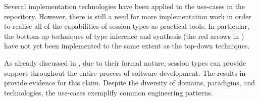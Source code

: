 
Several implementation technologies have been applied to the use-cases in the repository. However, there is still a need for more implementation work in order to realise all of the capabilities of session types as practical tools. In particular, the bottom-up techniques of type inference and synthesis (the red arrows in ) have not yet been implemented to the same extent as the top-down techniques.



%	
%	



As already discussed in ,
due to their formal
nature,
session types can provide support throughout the
entire process of software development.
The results in  provide evidence for this claim.
%
Despite the diversity of domains, paradigms,
and technologies, the use-cases exemplify common engineering patterns.

